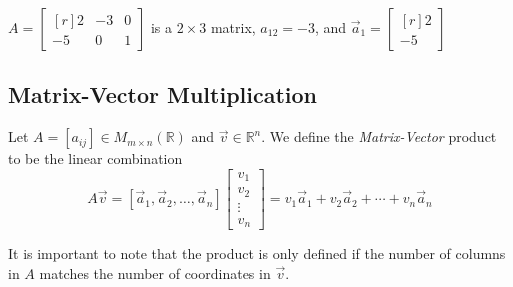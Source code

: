 \begin{example}
$A=\begin{bmatrix*}[r]
2 & -3 & 0 \\
-5 & 0 & 1 
\end{bmatrix*}$
is a $2 \times 3$ matrix, $a_{12}=-3$, and  
$\vec{a}_1=\begin{bmatrix*}[r] 2 \\ -5 \end{bmatrix*} $
\end{example}

\subsection{Matrix-Vector Multiplication}

\begin{definition}
Let $A=[a_{ij}]\in M_{m\times n}(\mathbb{R})$ and $\vec{v} \in \mathbb{R}^n$.  
We define the \emph{Matrix-Vector} product to be the linear combination 
\[
A\vec{v}=[\vec{a}_1, \vec{a}_2, \ldots ,\vec{a}_n]\begin{bmatrix}v_1 \\ v_2 \\ 
\vdots \\ v_n \end{bmatrix}=v_1\vec{a}_1+v_2\vec{a}_2+\cdots+v_n\vec{a}_n
\]
\end{definition} 
\begin{remark}
It is important to note that the product is only defined if the number of columns in $A$ matches the number of coordinates in $\vec{v}$.
\end{remark}

